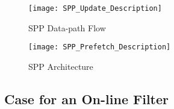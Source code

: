 \begin{figure}
  \begin{center}
  \texttt{[image: SPP\_Update\_Description]}
  \caption{SPP Data-path Flow}
  \label{fig:spp_update}
  \end{center}
\end{figure}


\begin{figure}
  \begin{center}
  \texttt{[image: SPP\_Prefetch\_Description]}
  \caption{SPP Architecture}
  \label{fig:spp_structure}
  \end{center}
\end{figure}




\subsection{Case for an On-line Filter}
\label{Background-Case}

